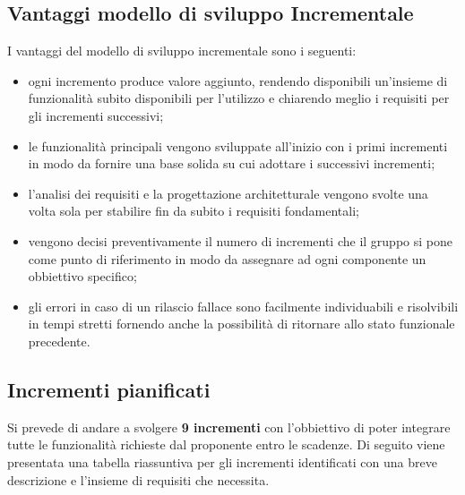 \subsection{Vantaggi modello di sviluppo Incrementale}
I vantaggi del modello di sviluppo incrementale sono i seguenti:
\begin{itemize}
	\item ogni incremento produce valore aggiunto, rendendo disponibili un'insieme di funzionalità subito disponibili per l'utilizzo e chiarendo meglio i requisiti per gli incrementi successivi;
	\item le funzionalità principali vengono sviluppate all'inizio con i primi incrementi in modo da fornire una base solida su cui adottare i successivi incrementi;
	\item l'analisi dei requisiti e la progettazione architetturale vengono svolte una volta sola per stabilire fin da subito i requisiti fondamentali;
	\item vengono decisi preventivamente il numero di incrementi che il gruppo si pone come punto di riferimento in modo da assegnare ad ogni componente un obbiettivo specifico;
	\item gli errori in caso di un rilascio fallace sono facilmente individuabili e risolvibili in tempi stretti fornendo anche la possibilità di ritornare allo stato funzionale precedente.
\end{itemize}

\subsection{Incrementi pianificati}

Si prevede di andare a svolgere \textbf{9 incrementi} con l'obbiettivo di poter integrare tutte le funzionalità richieste dal proponente entro le scadenze. Di seguito viene presentata una tabella riassuntiva per gli incrementi identificati con una breve descrizione e l'insieme di requisiti che necessita.

